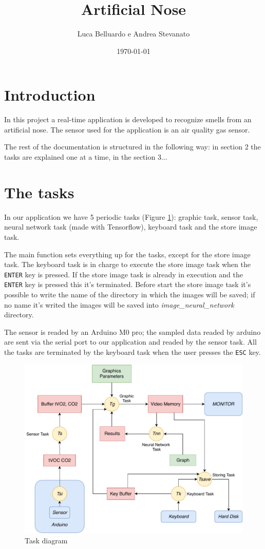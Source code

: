 \documentclass[12pt]{article}
\title{Artificial Nose}
\author{Luca Belluardo e Andrea Stevanato}
\date{\today}
\begin{document}
\maketitle
\tableofcontents

\section{Introduction}
In this project a real-time application is developed to recognize smells from an
artificial nose. The sensor used for the application is an air quality gas 
sensor.

The rest of the documentation is structured in the following way: in section
2 the tasks are explained one at a time, in the section 3...

\section{The tasks}
In our application we have 5 periodic tasks (Figure \ref{tdiagram}): graphic
task, sensor task, neural network task (made with Tensorflow), keyboard task
and the store image task.

The main function sets everything up for the tasks, except for the store
image task. The keyboard task is in charge to execute the store image task
when the \texttt{ENTER} key is pressed. If the store image task is already in
execution and the \texttt{ENTER} key is pressed this it's terminated.
Before start the store image task it's possible to write the name of the
directory in which the images will be saved; if no name it's writed the
images will be saved into \textit{image\_neural\_network} directory.

The sensor is readed by an Arduino M0 pro; the sampled data readed by arduino
are sent via the serial port to our application and readed by the sensor
task. All the tasks are terminated by the keyboard task when the user presses
the \texttt{ESC} key.

\begin{figure}[!t]
    \includegraphics[width=\textwidth]{diagram.pdf}
    \caption{Task diagram}
    \label{tdiagram}
\end{figure}
\end{document}

